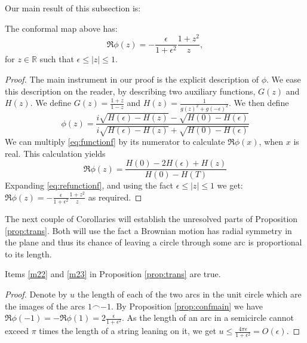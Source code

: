{Our main result of this subsection is:
\begin{propos}\label{prop:confmain}
The conformal map above has:
$$\Re \phi(z) = -\frac{\epsilon}{1+\epsilon^2}\frac{1+z^2}{z},$$
for $z\in\mathbb{R}$ such that $\epsilon\le|z|\le1$.
\end{propos}
\begin{proof}
The main instrument in our proof is the explicit description of $\phi$.
We ease this description on the reader, by describing two
auxiliary functions, $G(z)$ and $H(z)$. We define $G(z)=\frac{1+z}{1-z}$
and $H(z)=\frac1{g(z)^2+g(-\epsilon)^2}$. We then define
\begin{equation}\label{eq:functionf}
\phi(z)=\frac{i\sqrt{H(\epsilon)-H(z)}-\sqrt{H(0)-H(\epsilon)}}{i\sqrt{H(\epsilon)-H(z)}+\sqrt{H(0)-H(\epsilon)}}
\end{equation}
We can multiply \eqref{eq:functionf} by its numerator to calculate $\Re \phi(x)$, when $x$ is real. This calculation yields
\begin{equation}\label{eq:refunctionf}
\Re \phi(z)=\frac{H(0)-2H(\epsilon)+H(z)}{H(0)-H(T)}
\end{equation}
Expanding \eqref{eq:refunctionf}, and using the fact $\epsilon\le |z|\le1$ we get:
$\Re \phi(z) = -\frac{\epsilon}{1+\epsilon^2}\frac{1+z^2}{z}$ as required.
\end{proof}

The next couple of Corollaries will establish the unresolved parts of Proposition \ref{prop:trans}. Both will use the fact a Brownian motion has radial symmetry in the plane and thus its chance of leaving a circle through some arc is proportional to its length.

\begin{cor}\label{m22and23true}
Items \ref{m22} and \ref{m23} in Proposition \ref{prop:trans} are true.
\end{cor}
\begin{proof}
Denote by $u$ the length of each of the two arcs in the unit circle
which are the images of the arcs $1\frown-1$. By Proposition
\ref{prop:confmain} we have $\Re \phi(-1)=-\Re
\phi(1)=2\frac{\epsilon}{1+\epsilon^2}$. As the length of an arc in a
semicircle cannot exceed $\pi$ times the length of a string leaning on
it, we get $u \le \frac{4\pi\epsilon}{1+\epsilon^2} = O(\epsilon)$.
\end{proof}

}
